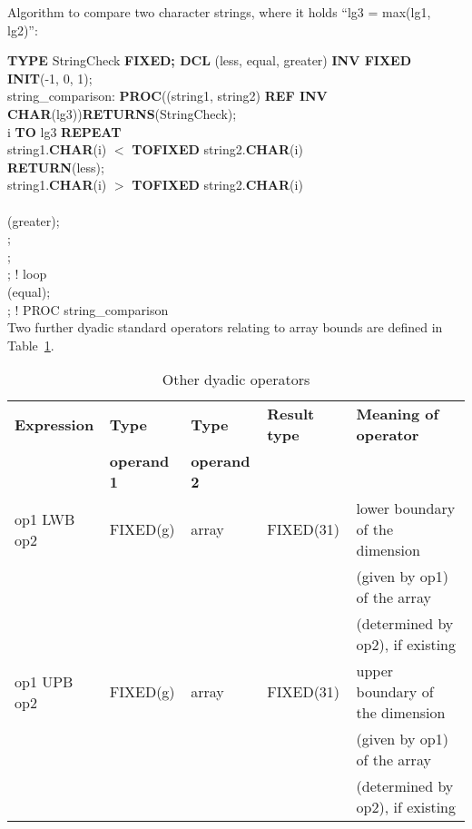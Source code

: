 Algorithm to compare two character strings, where it holds ``lg3 =
max(lg1, lg2)'':

{\bf TYPE} StringCheck
{\bf FIXED; DCL} (less, equal, greater) {\bf INV FIXED INIT}(-1, 0, 1);\\
\x string\_comparison: {\bf PROC}((string1, string2) {\bf REF INV CHAR}(lg3)){\bf RETURNS}(StringCheck);\\
\x {} i {\bf TO} lg3 {\bf REPEAT}\\
\x \x {} string1.{\bf CHAR}(i) $<$ {\bf TOFIXED} string2.{\bf CHAR}(i)\\
\x \x {} {\bf RETURN}(less);\\
\x \x {} string1.{\bf CHAR}(i) $>$ {\bf TOFIXED} string2.{\bf CHAR}(i)\\
\x \x \x {}\\
\x \x \x {}(greater);\\
\x \x \x {};\\
\x \x {};\\
\x {}; ! loop\\
\x {}(equal);\\
; ! PROC string\_comparison\\


Two further dyadic standard operators relating to array bounds are defined in Table~\ref{tab79}.

\begin{table} %
\begin{center}
\caption{Other dyadic operators}
\label{tab79}
\vspace{5mm}
\begin{tabular}{|l|l|l|l|l|}
\hline
{\bf Expression} & {\bf Type}      & {\bf Type}      & {\bf Result type} & {\bf Meaning of operator}\\
                 & {\bf operand 1} & {\bf operand 2} &                   & \\ \hline

op1 LWB op2      & FIXED(g)        & array           & FIXED(31)         & lower boundary of the dimension\\
                 &                 &                 &                   & (given by op1) of the array\\
                 &                 &                 &                   & (determined by op2), if existing\\ \hline

op1 UPB op2      & FIXED(g)        & array           & FIXED(31)         & upper boundary of the dimension\\
                 &                 &                 &                   & (given by op1) of the array\\
                 &                 &                 &                   & (determined by op2), if existing\\ 
\hline
\end{tabular}
\end{center}
\end{table}

